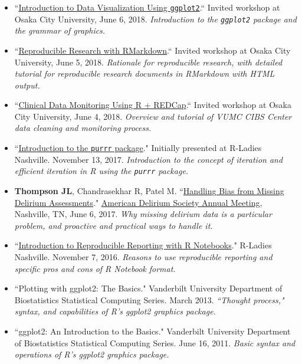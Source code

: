 \documentclass[5pt]{article}
\begin{document}
\begin{itemize}
\item ``\href{https://jenthompson.me/slides/DataVisggplot22018/datavis_ggplot2.html}{Introduction to Data Visualization Using \texttt{ggplot2}}.`` Invited workshop at Osaka City University, June 6, 2018. \emph{Introduction to the \texttt{ggplot2} package and the grammar of graphics.}
\item ``\href{https://jenthompson.me/slides/RepResRMD/rmarkdownworkshop.html}{Reproducible Research with RMarkdown}.`` Invited workshop at Osaka City University, June 5, 2018. \emph{Rationale for reproducible research, with detailed tutorial for reproducible research documents in RMarkdown with HTML output.}
\item ``\href{https://github.com/jenniferthompson/DataCleanExample}{Clinical Data Monitoring Using R + REDCap}.`` Invited workshop at Osaka City University, June 4, 2018. \emph{Overview and tutorial of VUMC CIBS Center data cleaning and monitoring process.}
\item ``\href{https://github.com/jenniferthompson/RLadiesIntroToPurrr}{Introduction to the \texttt{purrr} package}." Initially presented at R-Ladies Nashville. November 13, 2017. \emph{Introduction to the concept of iteration and efficient iteration in R using the \texttt{purrr} package.}
\item \textbf{Thompson JL}, Chandrasekhar R, Patel M. ``\href{https://github.com/jenniferthompson/ADS2017}{Handling Bias from Missing Delirium Assessments}." \href{http://www.cvent.com/events/7th-annual-american-delirium-society/event-summary-cd74fed5605a4918bc0a9c0e28561bac.aspx}{American Delirium Society Annual Meeting}, Nashville, TN, June 6, 2017. \emph{Why missing delirium data is a particular problem, and proactive and practical ways to handle it.}
\item ``\href{https://github.com/rladies/meetup-presentations_nashville/blob/master/2016-11-07_RNotebooks.md}{Introduction to Reproducible Reporting with R Notebooks}." R-Ladies Nashville. November 7, 2016. \emph{Reasons to use reproducible reporting and specific pros and cons of R Notebook format.}
\item ``Plotting with ggplot2: The Basics." Vanderbilt University Department of Biostatistics Statistical Computing Series. March 2013. \emph{``Thought process," syntax, and capabilities of R's ggplot2 graphics package.}
\item ``ggplot2: An Introduction to the Basics." Vanderbilt University Department of Biostatistics Statistical Computing Series. June 16, 2011. \emph{Basic syntax and operations of R’s ggplot2 graphics package.}

\end{itemize}
\end{document}
